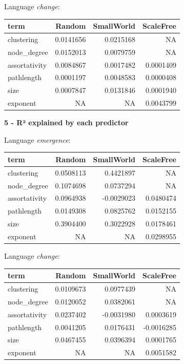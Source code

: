 \documentclass[
]{article}
\begin{document}
Language \emph{change}:

\begin{longtable}[]{@{}lrrr@{}}
\toprule()
term & Random & SmallWorld & ScaleFree \\
\midrule()
\endhead
clustering & 0.0141656 & 0.0215168 & NA \\
node\_degree & 0.0152013 & 0.0079759 & NA \\
assortativity & 0.0084867 & 0.0017482 & 0.0001409 \\
pathlength & 0.0001197 & 0.0048583 & 0.0000408 \\
size & 0.0007847 & 0.0131846 & 0.0001940 \\
exponent & NA & NA & 0.0043799 \\
\bottomrule()
\end{longtable}

\textbf{5 - R² explained by each predictor}

Language \emph{emergence}:

\begin{longtable}[]{@{}lrrr@{}}
\toprule()
term & Random & SmallWorld & ScaleFree \\
\midrule()
\endhead
clustering & 0.0508113 & 0.4421897 & NA \\
node\_degree & 0.1074698 & 0.0737294 & NA \\
assortativity & 0.0964938 & -0.0029023 & 0.0480474 \\
pathlength & 0.0149308 & 0.0825762 & 0.0152155 \\
size & 0.3904400 & 0.3022928 & 0.0178461 \\
exponent & NA & NA & 0.0298955 \\
\bottomrule()
\end{longtable}

Language \emph{change}:

\begin{longtable}[]{@{}lrrr@{}}
\toprule()
term & Random & SmallWorld & ScaleFree \\
\midrule()
\endhead
clustering & 0.0109673 & 0.0977439 & NA \\
node\_degree & 0.0120052 & 0.0382061 & NA \\
assortativity & 0.0237402 & -0.0031980 & 0.0003619 \\
pathlength & 0.0041205 & 0.0176431 & -0.0016285 \\
size & 0.0467455 & 0.0396394 & 0.0001765 \\
exponent & NA & NA & 0.0051582 \\
\bottomrule()
\end{longtable}
\end{document}
